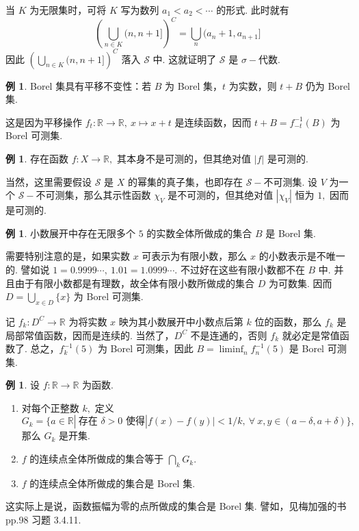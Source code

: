 \documentclass[12pt, a4paper, oneside]{book}
\numberwithin{figure}{section}
\theoremstyle{definition}
\newtheorem{example}[theorem]{例}
\begin{document}
当 $K$ 为无限集时，可将 $K$ 写为数列 $a_1<a_2<\cdots$ 的形式. 此时就有 
\begin{equation}
    \left(\bigcup_{n\in K}(n,n+1]\right)^C = \bigcup_n (a_n+1,a_{n+1}]
\end{equation}
因此 $\left(\bigcup_{n\in K}(n,n+1]\right)^C$ 落入 $\mathcal S$ 中. 这就证明了 $\mathcal S$ 是 $\sigma-$代数.

\begin{example}
    Borel 集具有平移不变性：若 $B$ 为 Borel 集，$t$ 为实数，则 $t+B$ 仍为 Borel 集.
\end{example}
这是因为平移操作 $f_t:\mathbb R\to\mathbb R,\ x\mapsto x+t$ 是连续函数，因而 $t+B= f_{-t}^{-1}(B)$ 为 Borel 可测集. 

\begin{example}
    存在函数 $f:X\to\mathbb R,$ 其本身不是可测的，但其绝对值 $|f|$ 是可测的.
\end{example}
当然，这里需要假设 $\mathcal S$ 是 $X$ 的幂集的真子集，也即存在 $\mathcal S-$不可测集. 设 $V$ 为一个 $\mathcal S-$不可测集，那么其示性函数 $\chi_V$ 是不可测的，但其绝对值 $|\chi_V|$ 恒为 $1,$ 因而是可测的.

\begin{example}
    小数展开中存在无限多个 $5$ 的实数全体所做成的集合 $B$ 是 Borel 集.
\end{example}
需要特别注意的是，如果实数 $x$ 可表示为有限小数，那么 $x$ 的小数表示是不唯一的. 譬如说 $1=0.9999\cdots,\ 1.01=1.0999\cdots.$ 
不过好在这些有限小数都不在 $B$ 中. 并且由于有限小数都是有理数，故全体有限小数所做成的集合 $D$ 为可数集. 因而 $D=\bigcup_{x\in D}\{x\}$ 为 Borel 可测集.

记 $f_k:D^C\to \mathbb R$ 为将实数 $x$ 映为其小数展开中小数点后第 $k$ 位的函数，那么 $f_k$ 是局部常值函数，因而是连续的. 当然了，$D^C$ 不是连通的，否则 $f_k$ 就必定是常值函数了.
总之，$f_k^{-1}(5)$ 为 Borel 可测集，因此 $B=\liminf_n f_n^{-1}(5)$ 是 Borel 可测集. 

\begin{example}
    设 $f:\mathbb R\to\mathbb R$ 为函数.
    \begin{enumerate}[label=\alph*)]
        \item 对每个正整数 $k,$ 定义 $G_k=\{a\in\mathbb R|\ \text{存在 $\delta>0$ 使得} |f(x)-f(y)|<1/k,\ \forall\ x,y\in (a-\delta,a+\delta) \},$ 那么 $G_k$ 是开集.
        \item $f$ 的连续点全体所做成的集合等于 $\bigcap_k G_k.$ 
        \item $f$ 的连续点全体所做成的集合是 Borel 集.
    \end{enumerate}
\end{example}
这实际上是说，函数振幅为零的点所做成的集合是 Borel 集. 譬如，见梅加强的书 \cite{Mei_2011} pp.98 习题 3.4.11.
\end{document}
